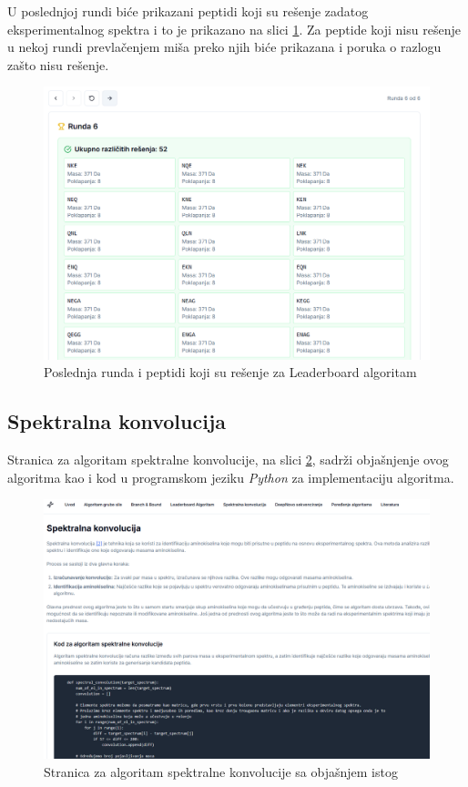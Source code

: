 \documentclass[12pt,oneside]{memoir}
\begin{document}
U poslednjoj rundi biće prikazani peptidi koji su rešenje zadatog eksperimentalnog spektra i to je prikazano na slici \ref{fig:leaderboard_3}. Za peptide koji nisu rešenje u nekoj rundi prevlačenjem miša preko njih biće prikazana i poruka o razlogu zašto nisu rešenje.
\begin{figure}[H]
\centering
\includegraphics[width=1\textwidth]{images/leaderboard_3.png}
\caption{Poslednja runda i peptidi koji su rešenje za Leaderboard algoritam}
\label{fig:leaderboard_3}
\end{figure}

\subsection{Spektralna konvolucija}
Stranica za algoritam spektralne konvolucije, na slici \ref{fig:convolution_1}, sadrži objašnjenje ovog algoritma kao i kod u programskom jeziku \emph{Python} za implementaciju algoritma.
\begin{figure}[H]
\centering
\includegraphics[width=1\textwidth]{images/convolution_1.png}
\caption{Stranica za algoritam spektralne konvolucije sa objašnjem istog}
\label{fig:convolution_1}
\end{figure}
\end{document}
